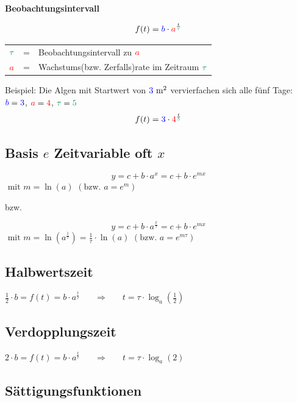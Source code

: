 \begin{multicols}
\forceCB
\begin{tcolorbox}[colback=white]
  \textbf{Beobachtungsintervall}
  
  $$f(t) = {\color{blue}b}\cdot{}{\color{red}a}^{\frac{t}{\color{ForestGreen}\tau}}$$
  \begin{tabular}{ccp{60mm}}
$\color{ForestGreen}\tau$ &=& Beobachtungsintervall zu $\color{red}a$\\
    $\color{red}a$ &=& Wachstums(bzw. Zerfalls)rate im Zeit\-raum $\color{ForestGreen}\tau$
    \end{tabular}

Beispiel: Die Algen mit Startwert von ${\color{blue}3} \textrm{ m}^2$ ver{\color{red}vier}fachen
sich alle {\color{ForestGreen}fünf} Tage:\\
${\color{blue}b}={\color{blue}3}$, ${\color{red}a}={\color{red}4}$, ${\color{ForestGreen}\tau}={\color{ForestGreen}5}$
$$f(t)= {\color{blue}3}\cdot{}{\color{red}4}^\frac{t}{\color{ForestGreen}5}$$
\end{tcolorbox}


\subsection*{Basis $e$ Zeitvariable oft $x$}

$$y=c+b\cdot{}a^x = c + b\cdot{}e^{mx}$$ $\textrm{ mit } m = \ln(a)
\,\,(\textrm{bzw. } a = e^m)$

bzw.

$$y=c+b\cdot{}a^\frac{x}\tau = c+b\cdot{}e^{mx}$$ $\textrm{ mit }
m=\ln\left(a^\frac1\tau\right) = \frac1\tau \cdot{}\ln(a)
\,\,(\textrm{bzw. } a = e^{m\tau})$

\subsection*{Halbwertszeit}
$\frac12 \cdot{} b = f(t) = b\cdot{}a^{\frac{t}{\tau}}\phantom{xxx}\Longrightarrow\phantom{xxx}t= \tau\cdot{}\log_a\left(\frac12\right)$

\subsection*{Verdopplungszeit}
$2\cdot{}b = f(t) = b\cdot{}a^{\frac{t}{\tau}}\phantom{xxx}\Longrightarrow\phantom{xxx}t = \tau\cdot{}\log_a(2)$

\subsection*{Sättigungsfunktionen}



\end{multicols}
